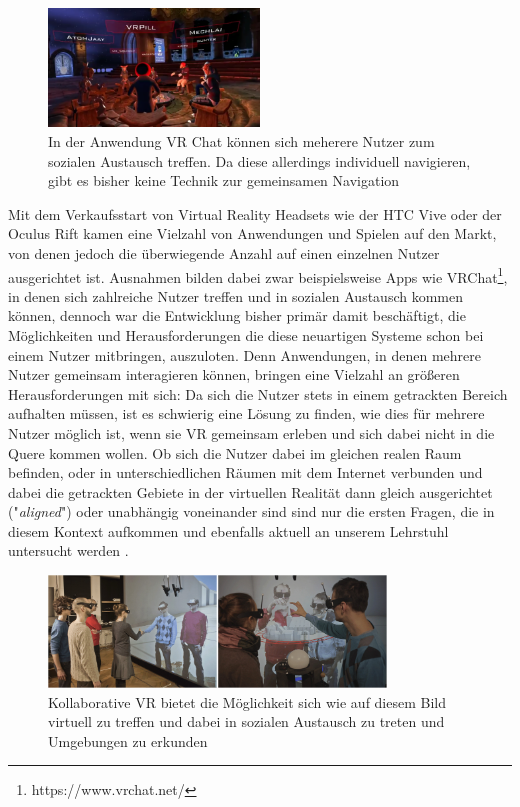 \begin{figure}[h]
  \centering
  \includegraphics[width=0.5\textwidth]{images/vr_chat.png}
  \caption{In der Anwendung VR Chat können sich meherere Nutzer zum sozialen Austausch treffen. Da diese allerdings individuell navigieren, gibt es bisher keine Technik zur gemeinsamen Navigation}
  \label{fig:todo}
\end{figure}


Mit dem Verkaufsstart von Virtual Reality Headsets wie der HTC Vive oder der Oculus Rift kamen eine Vielzahl von Anwendungen und Spielen auf den Markt, von denen jedoch die überwiegende Anzahl auf einen einzelnen Nutzer ausgerichtet ist. Ausnahmen bilden dabei zwar beispielsweise Apps wie VRChat\footnote{https://www.vrchat.net/}, in denen sich zahlreiche Nutzer treffen und in sozialen Austausch kommen können, dennoch war die Entwicklung bisher primär damit beschäftigt, die Möglichkeiten und Herausforderungen die diese neuartigen Systeme schon bei einem Nutzer mitbringen, auszuloten. 
Denn Anwendungen, in denen mehrere Nutzer gemeinsam interagieren können, bringen eine Vielzahl an größeren Herausforderungen mit sich: Da sich die Nutzer stets in einem getrackten Bereich aufhalten müssen, ist es schwierig eine Lösung zu finden, wie dies für mehrere Nutzer möglich ist, wenn sie VR gemeinsam erleben und sich dabei nicht in die Quere kommen wollen. Ob sich die Nutzer dabei im gleichen realen Raum befinden, oder in unterschiedlichen Räumen mit dem Internet verbunden und dabei die getrackten Gebiete in der virtuellen Realität dann gleich ausgerichtet ("\textit{aligned}") oder unabhängig voneinander sind sind nur die ersten Fragen, die in diesem Kontext aufkommen und ebenfalls aktuell an unserem Lehrstuhl untersucht werden \cite{WeisskerMulti-RayReality}.

\begin{figure}[H]
	\centering
		\includegraphics[width=0.8\textwidth]{images/collaborative.jpg}
	\caption{Kollaborative VR bietet die Möglichkeit sich wie auf diesem Bild virtuell zu treffen und dabei in sozialen Austausch zu treten und Umgebungen zu erkunden \cite{BeckImmersiveTelepresence}}
\end{figure}


